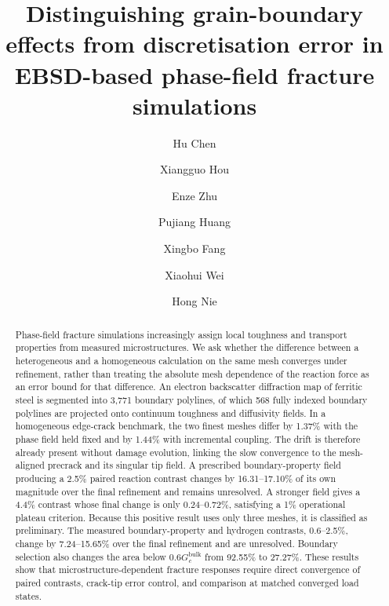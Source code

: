 \documentclass[preprint,12pt]{elsarticle}
\begin{document}
\raggedbottom
\begin{frontmatter}

\title{Distinguishing grain-boundary effects from discretisation error in EBSD-based phase-field fracture simulations}

\author[nuaa1]{Hu Chen}
\author[nuaa2,skl]{Xiangguo Hou}
\author[saddri]{Enze Zhu}
\author[nuaa2,skl]{Pujiang Huang}
\author[nuaa2,skl]{Xingbo Fang}
\author[nuaa2,skl]{Xiaohui Wei}
\author[nuaa2,skl]{Hong Nie}


\begin{abstract}
Phase-field fracture simulations increasingly assign local toughness and transport properties from measured microstructures. We ask whether the difference between a heterogeneous and a homogeneous calculation on the same mesh converges under refinement, rather than treating the absolute mesh dependence of the reaction force as an error bound for that difference. An electron backscatter diffraction map of ferritic steel is segmented into 3,771 boundary polylines, of which 568 fully indexed boundary polylines are projected onto continuum toughness and diffusivity fields. In a homogeneous edge-crack benchmark, the two finest meshes differ by 1.37\% with the phase field held fixed and by 1.44\% with incremental coupling. The drift is therefore already present without damage evolution, linking the slow convergence to the mesh-aligned precrack and its singular tip field. A prescribed boundary-property field producing a 2.5\% paired reaction contrast changes by 16.31--17.10\% of its own magnitude over the final refinement and remains unresolved. A stronger field gives a 4.4\% contrast whose final change is only 0.24--0.72\%, satisfying a 1\% operational plateau criterion. Because this positive result uses only three meshes, it is classified as preliminary. The measured boundary-property and hydrogen contrasts, 0.6--2.5\%, change by 7.24--15.65\% over the final refinement and are unresolved. Boundary selection also changes the area below $0.6G_c^{\mathrm{bulk}}$ from 92.55\% to 27.27\%. These results show that microstructure-dependent fracture responses require direct convergence of paired contrasts, crack-tip error control, and comparison at matched converged load states.
\end{abstract}


\end{frontmatter}
\end{document}
